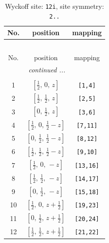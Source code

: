 \documentclass[fleqn,8pt]{jsarticle}
\begin{document}
\begin{longtable}{ccc}
\caption{Wyckoff site: {\tt 12i}, site symmetry: {\tt 2..}}
 \\
 \hline \hline
No. & position & mapping \\ \hline \endfirsthead

\multicolumn{2}{l}{\tablename\ \thetable{}} \\
 \hline \hline
No. & position & mapping \\ \hline \endhead

 \hline \hline
\multicolumn{2}{r}{\footnotesize\it continued ...} \\ \endfoot

 \hline \hline
\multicolumn{2}{r}{} \\ \endlastfoot

1 & $\left[ \frac{1}{2},\, 0,\, z \right]$ & {\tt [1,4]} \\ \hline
2 & $\left[ \frac{1}{2},\, \frac{1}{2},\, z \right]$ & {\tt [2,5]} \\ \hline
3 & $\left[ 0,\, \frac{1}{2},\, z \right]$ & {\tt [3,6]} \\ \hline
4 & $\left[ \frac{1}{2},\, 0,\, \frac{1}{2} - z \right]$ & {\tt [7,11]} \\ \hline
5 & $\left[ 0,\, \frac{1}{2},\, \frac{1}{2} - z \right]$ & {\tt [8,12]} \\ \hline
6 & $\left[ \frac{1}{2},\, \frac{1}{2},\, \frac{1}{2} - z \right]$ & {\tt [9,10]} \\ \hline
7 & $\left[ \frac{1}{2},\, 0,\, - z \right]$ & {\tt [13,16]} \\ \hline
8 & $\left[ \frac{1}{2},\, \frac{1}{2},\, - z \right]$ & {\tt [14,17]} \\ \hline
9 & $\left[ 0,\, \frac{1}{2},\, - z \right]$ & {\tt [15,18]} \\ \hline
10 & $\left[ \frac{1}{2},\, 0,\, z + \frac{1}{2} \right]$ & {\tt [19,23]} \\ \hline
11 & $\left[ 0,\, \frac{1}{2},\, z + \frac{1}{2} \right]$ & {\tt [20,24]} \\ \hline
12 & $\left[ \frac{1}{2},\, \frac{1}{2},\, z + \frac{1}{2} \right]$ & {\tt [21,22]} \\
\end{longtable}
\renewcommand{\arraystretch}{1.2}
\end{document}
